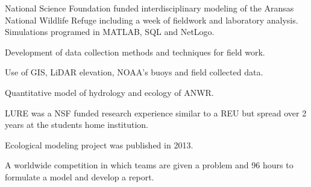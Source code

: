 \documentclass[letterpaper]{deedy-resume} %
\begin{document}
\sectionspace %




\vspace{\topsep}
National Science Foundation funded interdisciplinary modeling of the Aransas National Wildlife Refuge including a week of fieldwork and laboratory analysis. Simulations programed in MATLAB, SQL and NetLogo.
\vspace{\topsep}
 \begin{tightitemize}
    \item Development of data collection methods and techniques for field work.
    \item Use of GIS, LiDAR elevation, NOAA's buoys and field collected data. 
    \item Quantitative model of hydrology and ecology of ANWR. 
  \end{tightitemize}

\sectionspace %



\vspace{\topsep}
LURE was a NSF funded research experience similar to a REU but spread over 2 years at the students home institution.  
\vspace{\topsep}
  \begin{tightitemize}
    \item Ecological modeling project was published in 2013.  
    
  \end{tightitemize}


\sectionspace %

\vspace{\topsep}
A worldwide competition in which teams are given a problem and 96 hours to formulate a model and develop a report.
\vspace{\topsep}
\end{document}
